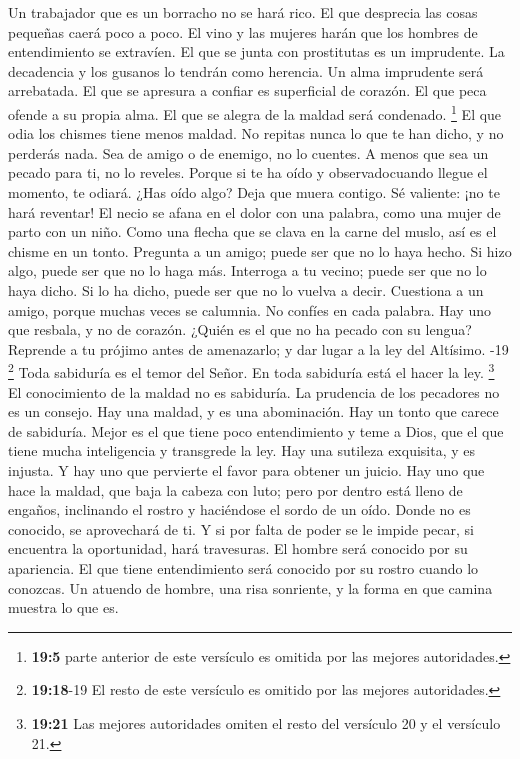  Un trabajador que es un borracho no se hará rico. El que
desprecia las cosas pequeñas caerá poco a poco.  El vino y
las mujeres harán que los hombres de entendimiento se extravíen. El que
se junta con prostitutas es un imprudente.  La decadencia
y los gusanos lo tendrán como herencia. Un alma imprudente será
arrebatada.  El que se apresura a confiar es superficial
de corazón. El que peca ofende a su propia alma.  El que
se alegra de la maldad será condenado. \footnote{\textbf{19:5} parte
  anterior de este versículo es omitida por las mejores autoridades.}
 El que odia los chismes tiene menos maldad.
 No repitas nunca lo que te han dicho, y no perderás nada.
 Sea de amigo o de enemigo, no lo cuentes. A menos que sea
un pecado para ti, no lo reveles.  Porque si te ha oído y
observadocuando llegue el momento, te odiará.  ¿Has oído
algo? Deja que muera contigo. Sé valiente: ¡no te hará reventar!
 El necio se afana en el dolor con una palabra, como una
mujer de parto con un niño.  Como una flecha que se clava
en la carne del muslo, así es el chisme en un tonto. 
Pregunta a un amigo; puede ser que no lo haya hecho. Si hizo algo, puede
ser que no lo haga más.  Interroga a tu vecino; puede ser
que no lo haya dicho. Si lo ha dicho, puede ser que no lo vuelva a
decir.  Cuestiona a un amigo, porque muchas veces se
calumnia. No confíes en cada palabra.  Hay uno que
resbala, y no de corazón. ¿Quién es el que no ha pecado con su lengua?
 Reprende a tu prójimo antes de amenazarlo; y dar lugar a
la ley del Altísimo. -19 \footnote{\textbf{19:18}-19 El
  resto de este versículo es omitido por las mejores autoridades.}
 Toda sabiduría es el temor del Señor. En toda sabiduría
está el hacer la ley.  \footnote{\textbf{19:21} Las
  mejores autoridades omiten el resto del versículo 20 y el versículo
  21.}  El conocimiento de la maldad no es sabiduría. La
prudencia de los pecadores no es un consejo.  Hay una
maldad, y es una abominación. Hay un tonto que carece de sabiduría.
 Mejor es el que tiene poco entendimiento y teme a Dios,
que el que tiene mucha inteligencia y transgrede la ley. 
Hay una sutileza exquisita, y es injusta. Y hay uno que pervierte el
favor para obtener un juicio.  Hay uno que hace la
maldad, que baja la cabeza con luto; pero por dentro está lleno de
engaños,  inclinando el rostro y haciéndose el sordo de
un oído. Donde no es conocido, se aprovechará de ti.  Y
si por falta de poder se le impide pecar, si encuentra la oportunidad,
hará travesuras.  El hombre será conocido por su
apariencia. El que tiene entendimiento será conocido por su rostro
cuando lo conozcas.  Un atuendo de hombre, una risa
sonriente, y la forma en que camina muestra lo que es.

